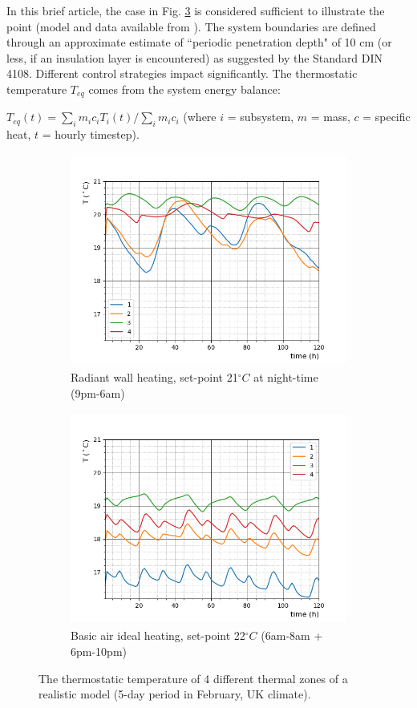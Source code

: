 \documentclass[10pt]{extarticle} %
\begin{document}
In this brief article, the case in Fig. \ref{fig:casestudy} is considered sufficient to illustrate the point (model and data available from \cite{Bonetti2020}). The system boundaries are defined through an approximate estimate of ``periodic penetration depth" of 10 cm (or less, if an insulation layer is encountered) as suggested by the Standard DIN 4108. Different control strategies impact significantly. The thermostatic temperature $T_{eq}$ comes from the system energy balance: 

$T_{eq}(t)={\sum_i m_i c_i T_i(t)} / {\sum_i m_i c_i}$  \quad  (where $i$ = subsystem, $m$ = mass, $c$ = specific heat, $t$ = hourly timestep).

\vskip-0.35cm


\begin{figure}[h]
 
\begin{subfigure}{0.5\textwidth}
\includegraphics[width=0.99\linewidth, height=7cm]{images/1.png}
\vskip-0.1cm 
\caption{Radiant wall heating, set-point 21$^\circ C$ at night-time (9pm-6am)}
\label{fig:esprmodel}
\end{subfigure}
\begin{subfigure}{0.5\textwidth}
\includegraphics[width=0.99\linewidth, height=7cm]{images/2.png}
\vskip-0.1cm 
\caption{Basic air ideal heating, set-point 22$^\circ C$ (6am-8am + 6pm-10pm)}
\label{fig:constructionelements}
\end{subfigure}
 \vskip-0.2cm
\caption{The thermostatic temperature of 4 different thermal zones of a realistic model (5-day period in February, UK climate).}
\label{fig:casestudy}
\end{figure}
\end{document}
